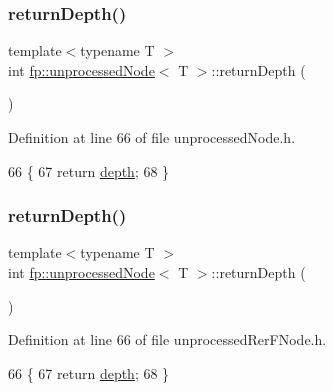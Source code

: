 \subsubsection{\texorpdfstring{return\+Depth()}{returnDepth()}\hspace{0.1cm}{\footnotesize\ttfamily [1/2]}}
{\footnotesize\ttfamily template$<$typename T $>$ \\
int \hyperlink{classfp_1_1unprocessedNode}{fp\+::unprocessed\+Node}$<$ T $>$\+::return\+Depth (\begin{DoxyParamCaption}{ }\end{DoxyParamCaption})\hspace{0.3cm}{\ttfamily [inline]}}



Definition at line 66 of file unprocessed\+Node.\+h.


\begin{DoxyCode}
66                                         \{
67                     \textcolor{keywordflow}{return} \hyperlink{classfp_1_1unprocessedNode_a22ebfbc35a57e2d30b81220c94f4d0d3}{depth};
68                 \}
\end{DoxyCode}
\mbox{\label{classfp_1_1unprocessedNode_ac1b4cb820f5c29832f9a7ea7bf896139}} 
\subsubsection{\texorpdfstring{return\+Depth()}{returnDepth()}\hspace{0.1cm}{\footnotesize\ttfamily [2/2]}}
{\footnotesize\ttfamily template$<$typename T $>$ \\
int \hyperlink{classfp_1_1unprocessedNode}{fp\+::unprocessed\+Node}$<$ T $>$\+::return\+Depth (\begin{DoxyParamCaption}{ }\end{DoxyParamCaption})\hspace{0.3cm}{\ttfamily [inline]}}



Definition at line 66 of file unprocessed\+Rer\+F\+Node.\+h.


\begin{DoxyCode}
66                                         \{
67                     \textcolor{keywordflow}{return} \hyperlink{classfp_1_1unprocessedNode_a22ebfbc35a57e2d30b81220c94f4d0d3}{depth};
68                 \}
\end{DoxyCode}
\mbox{\label{classfp_1_1unprocessedNode_a5243ac02610f01c6b0df9d5fd6f6f857}} 
